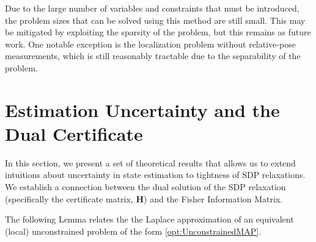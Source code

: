 \documentclass[lettersize,journal]{IEEEtran}
\newcommand{\rev}[1]{\color{red}{#1}\color{black}}
\begin{document}
Due to the large number of variables and constraints that must be introduced, the problem sizes that can be solved using this method are still small. This may be mitigated by exploiting the sparsity of the problem, but this remains as future work. One notable exception is the localization problem without relative-pose measurements, which is still reasonably tractable due to the separability of the problem. 


\section{Estimation Uncertainty and the Dual Certificate}\label{sec:Uncertainty}

In this section, we present a set of theoretical results that allows us to extend intuitions about uncertainty in state estimation to tightness of SDP relaxations. We establish a connection between the dual solution of the SDP relaxation (specifically the certificate matrix, $\bm{H}$) and the Fisher Information Matrix. 

The following Lemma relates the \rev{certificate matrix to} the Laplace approximation of an equivalent (local) unconstrained problem of the form \eqref{opt:UnconstrainedMAP}. \rev{Throughout this section, we will assume that we have access to the global minimum and explore properties of the associated certificate matrix.}
\end{document}

